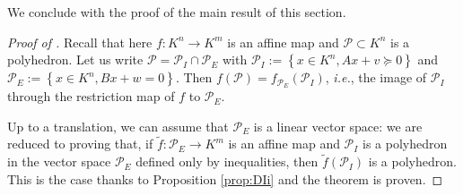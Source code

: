 \documentclass[sigconf]{acmart}
\newcommand{\PP}{\mathcal{P}}
\begin{document}
We conclude with the proof of the main result of this section.

\begin{proof}[Proof of ]
Recall that here $f : K^n \to K^m$ is an affine map and $\PP \subset K^n$ is a polyhedron.
Let us write $\PP = \PP_I \cap \PP_E$
with $\PP_I := \left\lbrace x \in K^n,  Ax+v \succeq 0 \right\rbrace$
and $\PP_E := \left\lbrace x \in K^n,  Bx+w=0 \right\rbrace$.
Then $f(\PP) = f_{\PP_E}(\PP_I)$, {\it i.e.}, the image of $\PP_I$ through the restriction
map of $f$ to $\PP_E$.

Up to a translation, we can assume that $\PP_E$ is a linear vector space:
we are reduced to proving that, if $\tilde{f}: \PP_E \to K^m$ is an affine map
and $\PP_I$ is a polyhedron in the vector space $\PP_E$ defined only by inequalities,
then $\tilde{f}(\PP_I)$ is a polyhedron. This is the case thanks to Proposition \ref{prop:DIi}
and the theorem is proven.
\end{proof}
\end{document}
